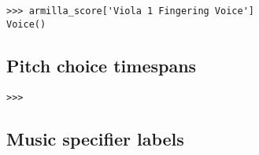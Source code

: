 \begin{comment}
<abjad>
armilla_score['Viola 1 Fingering Voice']
</abjad>
\end{comment}

\begin{singlespacing}
\vspace{-0.5\baselineskip}
\begin{lstlisting}
>>> armilla_score['Viola 1 Fingering Voice']
Voice()
\end{lstlisting}
\end{singlespacing}

\subsection{Pitch choice timespans}

\begin{comment}
<abjad>

</abjad>
\end{comment}

\begin{singlespacing}
\vspace{-0.5\baselineskip}
\begin{lstlisting}
>>>
\end{lstlisting}
\end{singlespacing}

\subsection{Music specifier labels}

